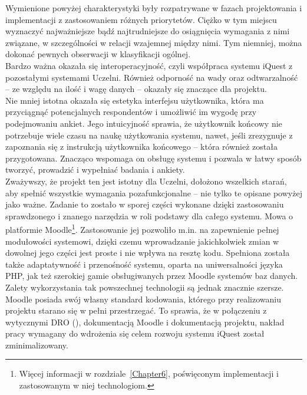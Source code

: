 Wymienione powyżej charakterystyki były rozpatrywane w fazach projektowania i implementacji z zastosowaniem różnych priorytetów. Ciężko w tym miejscu wyznaczyć najważniejsze bądź najtrudniejsze do osiągnięcia wymagania z nimi związane, w szczególności w relacji wzajemnej między nimi. Tym niemniej, można dokonać pewnych obserwacji w klasyfikacji ogólnej.\\

Bardzo ważna okazała się interoperacyjność, czyli współpraca systemu iQuest z pozostałymi systemami Uczelni. Również odporność na wady oraz odtwarzalność -- ze względu na ilość i wagę danych -- okazały się znaczące dla projektu. \\

Nie mniej istotna okazała się estetyka interfejsu użytkownika, która ma przyciągnąć potencjalnych respondentów i umożliwić im wygodę przy podejmowaniu ankiet. Jego intuicyjność sprawia, że użytkownik końcowy nie potrzebuje wiele czasu na naukę użytkowania systemu, nawet, jeśli zrezygnuje z zapoznania się z instrukcją użytkownika końcowego -- która również została przygotowana. Znacząco wspomaga on obsługę systemu i pozwala w łatwy sposób tworzyć, prowadzić i wypełniać badania i ankiety. \\

Zważywszy, że projekt ten jest istotny dla Uczelni, dołożono wszelkich starań, aby spełnić wszystkie wymagania pozafunkcjonalne -- nie tylko te opisane powyżej jako ważne. Zadanie to zostało w sporej części wykonane dzięki zastosowaniu sprawdzonego i znanego narzędzia w roli podstawy dla całego systemu. Mowa o platformie Moodle\footnote{Więcej informacji w rozdziale~\ref{Chapter6}, poświęconym implementacji i zastosowanym w niej technologiom.}. Zastosowanie jej pozwoliło m.in. na zapewnienie pełnej modułowości systemowi, dzięki czemu wprowadzanie jakichkolwiek zmian w dowolnej jego części jest proste i nie wpływa na resztę kodu. Spełniona została także adaptatywność i przenośność systemu, oparta na uniwersalności języka PHP, jak też szerokiej gamie obsługiwanych przez Moodle systemów baz danych. \\

Zalety wykorzystania tak powszechnej technologii są jednak znacznie szersze. Moodle posiada swój własny standard kodowania, którego przy realizowaniu projektu starano się w pełni przestrzegać. To sprawia, że w połączeniu z wytycznymi DRO (), dokumentacją Moodle i dokumentacją projektu, nakład pracy wymagany do wdrożenia się celem rozwoju systemu iQuest został zminimalizowany. \\

